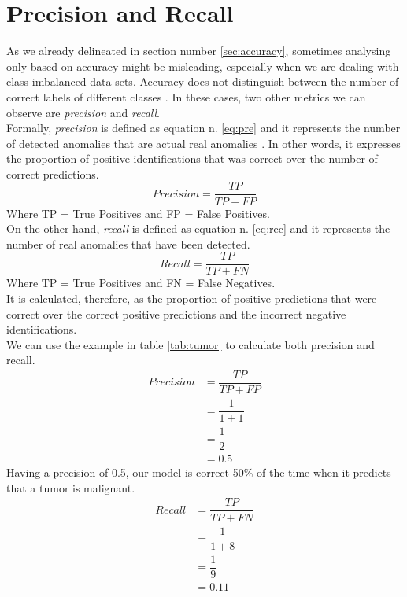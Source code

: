 \section{Precision and Recall}
As we already delineated in section number \ref{sec:accuracy}, sometimes analysing only based on accuracy might be misleading, especially when we are dealing with class-imbalanced data-sets. Accuracy does not distinguish between the number of correct labels of different classes \cite{metrics}. In these cases, two other metrics we can observe are \textit{precision} and \textit{recall}. \\
Formally, \textit{precision} is defined as equation n. \ref{eq:pre} and it represents the number of detected anomalies that are actual real anomalies \cite{tatbul2019precision}. 
In other words, it expresses the proportion of positive identifications that was correct over the number of correct predictions. 
\begin{equation}
Precision = \dfrac{TP}{TP+FP}
\label{eq:pre}    
\end{equation}
Where TP = True Positives and FP = False Positives. \\
On the other hand, \textit{recall} is defined as equation n. \ref{eq:rec} and it represents the number of real anomalies that have been detected. \cite{tatbul2019precision}
\begin{equation}
Recall = \dfrac{TP}{TP+FN}
\label{eq:rec}    
\end{equation}
Where TP = True Positives and FN = False Negatives.\\
It is calculated, therefore, as the proportion of positive predictions that were correct over the correct positive predictions and the incorrect negative identifications.  \\
We can use the example in table \ref{tab:tumor} to calculate both precision and recall. 
\begin{equation}
\begin{aligned}
Precision &= \dfrac{TP}{TP+FP}\\
          &= \dfrac{1}{1+1}\\
          &= \dfrac{1}{2}\\
          &= 0.5
\end{aligned}
\label{eq:pre_ex}    
\end{equation}
Having a precision of 0.5, our model is correct 50\% of the time when it predicts that a tumor is malignant. 
\begin{equation}
\begin{aligned}
Recall &= \dfrac{TP}{TP+FN}\\
          &= \dfrac{1}{1+8}\\
          &= \dfrac{1}{9}\\
          &= 0.11
\end{aligned}
\label{eq:rec2}    
\end{equation}
